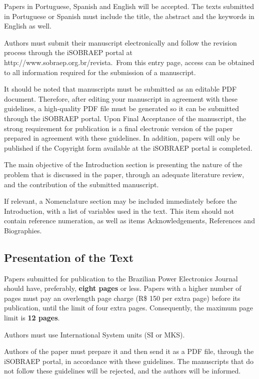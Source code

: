 \documentclass[english]{cobep-spec}
\begin{document}
Papers in Portuguese, Spanish and English will be accepted. The texts submitted in Portuguese or Spanish must include the title, the abstract and the keywords in English as well.

Authors must submit their manuscript electronically and follow the revision process through the iSOBRAEP portal at http://www.sobraep.org.br/revista.~From this entry page, access can be obtained to all information required for the submission of a manuscript.



It should be noted that manuscripts must be submitted as an editable PDF document. Therefore, after editing your manuscript in agreement with these guidelines, a high-quality PDF file must be generated so it can be submitted through the iSOBRAEP portal. Upon Final Acceptance of the manuscript, the strong requirement for publication is a final electronic version of the paper prepared in agreement with these guidelines. In addition, papers will only be published if the Copyright form available at the iSOBRAEP portal is completed.

The main objective of the Introduction section is presenting the nature of the problem that is discussed in the paper, through an adequate literature review, and the contribution of the submitted manuscript.

If relevant, a Nomenclature section may be included immediately before the Introduction, with a list of variables used in the text. This item should not contain reference numeration, as well as items Acknowledgements, References and Biographies.

\subsection{Presentation of the Text}
Papers submitted for publication to the Brazilian Power Electronics Journal should have, preferably, \textbf{eight pages} or less. Papers with a higher number of pages must pay an overlength page charge (R\$ 150 per extra page) before its publication, until the limit of four extra pages. Consequently, the maximum page limit is \textbf{12 pages}.

Authors must use International System units (SI or MKS).

Authors of the paper must prepare it and then send it as a PDF file, through the iSOBRAEP portal, in accordance with these guidelines. The manuscripts that do not follow these guidelines will be rejected, and the authors will be informed.
\end{document}
